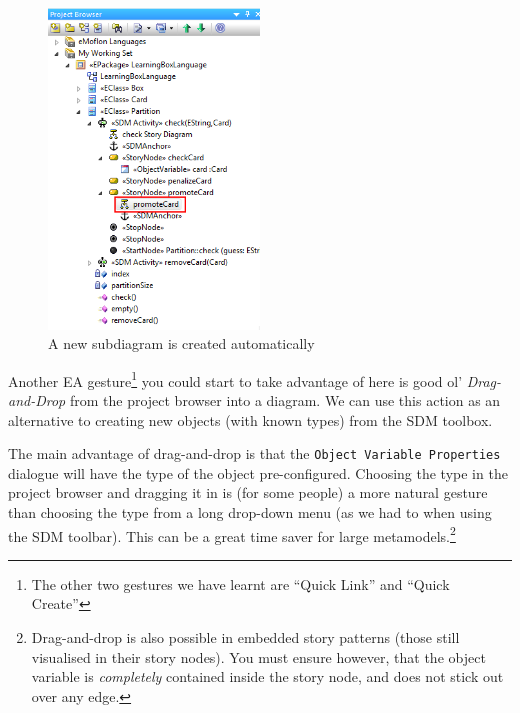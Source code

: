 \begin{stepbystep}
\begin{figure}[htbp]
\begin{center}
  \includegraphics[width=0.5\textwidth]{../../org.moflon.doc.handbook.03_storyDiagrams/04_checkCard/visCheImages/sdm_promoteCardProjBrowser}
  \caption{A new subdiagram is created automatically}
  \label{ea:sdm_new_sub_diagram}
\end{center}
\end{figure}

\newpage

Another EA gesture\footnote{The other two gestures we have learnt are ``Quick Link'' and ``Quick Create''} you could start to take advantage of here is good
ol' \emph{Drag-and-Drop} from the project browser into a diagram. We can use this action as an alternative to creating new objects (with known types) from
the SDM toolbox.

The main advantage of drag-and-drop is that the \texttt{Object Variable Pro\-per\-ties} dialogue will have the type of the object pre-configured. Choosing
the type in the project browser and dragging it in is (for some people) a more natural gesture than choosing the type from a long drop-down menu (as we had to
when using the SDM toolbar). This can be a great time saver for large metamodels.\footnote{Drag-and-drop is also possible in embedded story patterns
(those still visualised in their story nodes).  You must ensure however, that the object variable is \emph{completely} contained inside the story node, and does
not stick out over any edge.}

\vspace{0.5cm}


\end{stepbystep}
